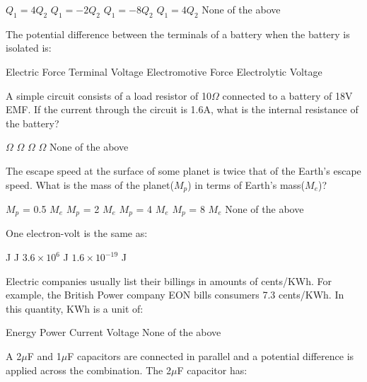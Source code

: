 \documentclass[12pt,addpoints]{exam}
\begin{document}
{{{\begin{questions}
					\begin{oneparchoices}
						\choice $Q_1=4Q_2$
						\choice $Q_1=-2Q_2$
						\choice $Q_1=-8Q_2$
						\choice $Q_1=4Q_2$
						\choice None of the above
					\end{oneparchoices}
					\question The potential difference between the terminals of a battery when the battery is isolated is:\\
					\begin{oneparchoices}
						\choice Electric Force
						\choice Terminal Voltage
						\choice Electromotive Force
						\choice Electrolytic Voltage
					\end{oneparchoices}
					\question A simple circuit consists of a load resistor of 10$\Omega$ connected to a battery of 18V EMF. If the current through the circuit is 1.6A, what is the internal resistance of the battery?\\
					\begin{oneparchoices}
						\choice 1.25$\Omega$
						\choice 12.5$\Omega$
						\choice 10$\Omega$
						\choice 1.6$\Omega$
						\choice None of the above
					\end{oneparchoices}
					\question The escape speed at the surface of some planet is twice that of the Earth's escape speed. What is the mass of the planet($M_p$) in terms of Earth's mass($M_e$)?\\
					\begin{oneparchoices}
						\choice $M_p$ = 0.5 $M_e$
						\choice $M_p$ = 2 $M_e$
						\choice $M_p$ = 4 $M_e$
						\choice $M_p$ = 8 $M_e$
						\choice None of the above
					\end{oneparchoices}
					\question One electron-volt is the same as:\\
					\begin{oneparchoices}
						\choice 3.6 J
						\choice 1.0 J
						\choice $3.6\times10^{6}$ J
						\choice $1.6\times10^{-19}$ J
					\end{oneparchoices}
					\question Electric companies usually list their billings in amounts of cents/KWh. For example, the British Power company EON bills consumers 7.3 cents/KWh. In this quantity, KWh is a unit of:\\
					\begin{oneparchoices}
						\choice Energy
						\choice Power
						\choice Current
						\choice Voltage
						\choice None of the above
					\end{oneparchoices}
					\question A 2$\mu$F and 1$\mu$F capacitors are connected in parallel and a potential difference is applied across the combination. The 2$\mu$F capacitor has:

\end{questions}}}}
\end{document}
